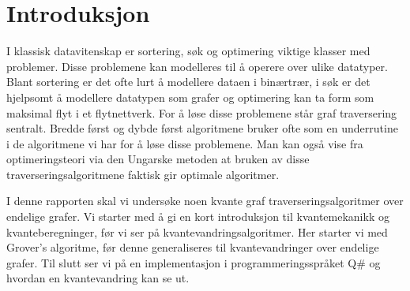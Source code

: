 \section{Introduksjon}

    I klassisk datavitenskap er sortering, søk og optimering viktige klasser med problemer. Disse problemene kan modelleres til å operere over ulike datatyper. Blant sortering er det ofte lurt å modellere dataen i binærtrær, i søk er det hjelpsomt å modellere datatypen som grafer og optimering kan ta form som maksimal flyt i et flytnettverk. For å løse disse problemene står graf traversering sentralt. Bredde først og dybde først algoritmene bruker ofte som en underrutine i de algoritmene vi har for å løse disse problemene. Man kan også vise fra optimeringsteori via den Ungarske metoden at bruken av disse traverseringsalgoritmene faktisk gir optimale algoritmer.

    I denne rapporten skal vi undersøke noen kvante graf traverseringsalgoritmer over endelige grafer. Vi starter med å gi en kort introduksjon til kvantemekanikk og kvanteberegninger, før vi ser på kvantevandringsalgoritmer. Her starter vi med Grover's algoritme, før denne generaliseres til kvantevandringer over endelige grafer. Til slutt ser vi på en implementasjon i programmeringsspråket Q\# og hvordan en kvantevandring kan se ut.